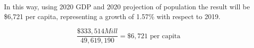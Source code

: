 \documentclass[svn, final]{rureport}
\begin{document}
In this way, using 2020 GDP and 2020 projection of population the result will be \$6,721 per capita, representing a growth of 1.57\% with respect to 2019.

\begin{equation}
    \frac{\$333,514Mill}{49,619,190}=\$6,721 \textrm{ per capita}
\end{equation}

\newpage





\end{document}
